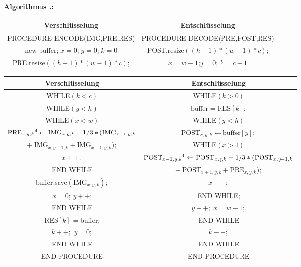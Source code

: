 \documentclass[a4paper,12pt]{article}
\newcounter{Algorithmus}
\newenvironment{Algorithmus}{
\medskip
        
        \setlength{\parindent}{0pt}
        \addtocounter{Algorithmus}{1}
        \textbf{\textsf{Algorithmus \thesubsection.\theAlgorithmus}:}}{
        \nopagebreak
        \vspace{-1.0ex}
        \bigskip
        
}
\begin{document}
\begin{Algorithmus}
\\
\begin{tabular}{c|c}
Verschlüsselung & Entschlüsselung
\\
\hline
PROCEDURE ENCODE(IMG,PRE,RES) & PROCEDURE DECODE(PRE,POST,RES)
\\
new buffer; $x=0$; $y=0$; $k=0$ & POST.resize$((h-1)*(w-1)*c)$;
\\
PRE.resize$((h-1)*(w-1)*c)$; & $x=w-1$;$y=0$; $k=c-1$
\end{tabular}
\begin{tabular}{c|c}
Verschlüsselung & Entschlüsselung
\\
\hline
WHILE$(k < c)$ &                  WHILE$(k > 0)$
\\
WHILE$(y < h)$ &               $\text{buffer} = \text{RES}[k];$
\\
WHILE$(x < w)$ &              WHILE$(y<h)$
\\
$\text{PRE}_{x,y,k}\footnotemark[4]\leftarrow \text{IMG}_{x,y,k} - 1/3 *(\text{IMG}_{x-1,y,k}$ &  $\text{POST}_{x,y,k}\leftarrow \text{buffer}[y];$
\\
$+\;\text{IMG}_{x,y-1,k} + \text{IMG}_{x+1,y,k});$  & WHILE$(x>1)$
\\
$x++;$ &  $\text{POST}_{x-1,y,k}\footnotemark[4]\leftarrow \text{POST}_{x,y,k} - 1/3 *(\text{POST}_{x,y-1,k} $    
\\
END WHILE  & $+\;\text{POST}_{x+1,y,k} + \text{PRE}_{x,y,k});$
\\
buffer.save$(\text{IMG}_{x,y,k});$  & $x--;$
\\
$x=0$; $y++$;  &   END WHILE; 
\\
END WHILE   & $y++;\;x=w-1;$ 
\\
RES$[k]$ = buffer;  &  END WHILE 
\\
$k++;$ $y=0;$   &   $k--;$ 
\\
END WHILE & END WHILE 
\\
END PROCEDURE & END PROCEDURE
\end{tabular}
\end{Algorithmus}
\end{document}
